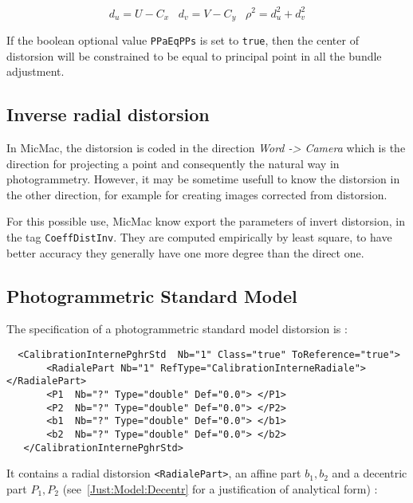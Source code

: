 \begin{equation}
    d_u =  U-C_x \;\;\; d_v=V-C_y \;\;\;
    \rho^2 = d_u ^2 + d_v ^2
\end{equation}

If the boolean optional value {\tt PPaEqPPs} is set to  {\tt true}, then the center
of distorsion will be constrained to be equal to principal point in all the bundle
adjustment.


\subsection{Inverse radial distorsion}

In MicMac, the distorsion is coded in the direction \emph{Word -> Camera} which
is the direction for projecting a point and consequently the natural way in photogrammetry.
However, it may be sometime usefull to know the distorsion in the other direction,
for example for creating images corrected from distorsion.

For this possible use, MicMac know export the parameters of invert distorsion,
in the tag {\tt CoeffDistInv}. They are computed empirically by least square,
to have better accuracy they generally have one more degree than the direct one.



\subsection{Photogrammetric Standard Model}

\label{SpGeo:Fraser}

The specification of a photogrammetric standard model distorsion is  :


\begin{verbatim}
  <CalibrationInternePghrStd  Nb="1" Class="true" ToReference="true">
       <RadialePart Nb="1" RefType="CalibrationInterneRadiale">    </RadialePart>
       <P1  Nb="?" Type="double" Def="0.0"> </P1>
       <P2  Nb="?" Type="double" Def="0.0"> </P2>
       <b1  Nb="?" Type="double" Def="0.0"> </b1>
       <b2  Nb="?" Type="double" Def="0.0"> </b2>
   </CalibrationInternePghrStd>
\end{verbatim}

It contains a radial distorsion {\tt <RadialePart>}, an affine part $b_1, b_2$ and
a decentric part $P_1,P_2$ (see~\ref{Just:Model:Decentr} for a justification of
analytical form) :

